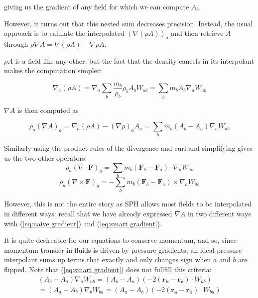 \documentclass[../main.tex]{subfiles}
\begin{document}
giving us the gradient of any field for which we can compute $A_b$.

However, it turns out \autocite{sph} that this nested sum decreases precision. Instead, the
usual approach is to calulate the interpolated $(\nabla(\rho A))_a$ and then retrieve $A$ through
$\rho\nabla A = \nabla(\rho A) - \nabla\rho A$.

$\rho A$ is a field like any other, but the fact that the density cancels in its interpolant makes
the computation simpler:

\begin{equation}
    \nabla_a (\rho A)
    = \nabla_a \sum_b \frac{m_b}{\rho_b} \rho_b A_b W_{ab}
    = \sum_b m_b A_b \nabla_a W_{ab}
\end{equation}

$\nabla A$ is then computed as

\begin{equation} \label{eq:smart gradient}
    \rho_a (\nabla A)_a
    = \nabla_a (\rho A) - (\nabla\rho)_a A_a
    = \sum_b m_b (A_b - A_a) \nabla_a W_{ab}
\end{equation}

Similarly using the product rules of the divergence and curl and simplifying gives us the two other
operators:
\begin{equation} \label{eq:divergence interpolant}
    \rho_a (\nabla\cdot\bm{F})_a
    = \sum_b m_b (\bm{F}_b - \bm{F}_a) \cdot \nabla_a W_{ab}
\end{equation}
\begin{equation}
    \rho_a (\nabla\times\bm{F})_a
    = - \sum_b m_b (\bm{F}_b - \bm{F}_a) \times \nabla_a W_{ab}
\end{equation}

However, this is not the entire story as SPH allows most fields to be interpolated in different
ways: recall that we have already expressed $\nabla A$ in two different ways with
(\ref{eq:naive gradient}) and
(\ref{eq:smart gradient}).

It is quite desireable for our equations to conserve momentum, and so, since momentum transfer in
fluids is driven by pressure gradients, an ideal pressure interpolant sums up terms that exactly and
only changes sign when $a$ and $b$ are flipped. Note that (\ref{eq:smart gradient}) does not fullfill this
criteria:
\begin{equation}
\begin{split}
    (A_b - A_a) \nabla_a W_{ab} = (A_b - A_a) (-2(\bm{r_b} - \bm{r_a}) \cdot W_{ab}) \\
    = (A_a - A_b) \nabla_b W_{ba} = (A_a - A_b) (-2(\bm{r_a} - \bm{r_b}) \cdot W_{ba})
\end{split}
\end{equation}
\end{document}
